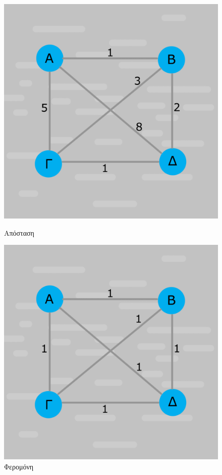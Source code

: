 \begin{figure}[ht]
    \begin{minipage}[c]{.46\linewidth}
        \centering
        \includegraphics[scale=0.15]{2947_thesis/pictures/apostaseis.png}
        \caption{Απόσταση}
        \label{distance}
    \end{minipage}
    \begin{minipage}[c]{.46\linewidth}
        \centering
        \includegraphics[scale=0.15]{2947_thesis/pictures/feromoni.png}
        \caption{Φερομόνη}
        \label{pher}
    \end{minipage}
\end{figure}
